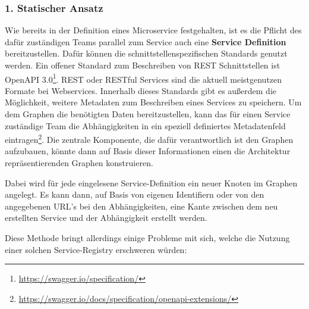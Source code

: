 \subsubsection*{1. Statischer Ansatz}
Wie bereits in der Definition eines Microservice festgehalten, ist es die Pflicht des dafür zuständigen Teams parallel zum Service auch eine \textbf{Service Definition} bereitzustellen. Dafür können die schnittstellenspezifischen Standards genutzt werden. Ein offener Standard zum Beschreiben von REST Schnittstellen ist OpenAPI 3.0\footnote{\url{https://swagger.io/specification/}}. REST oder RESTful Services sind die aktuell meistgenutzen Formate bei Webservices. Innerhalb dieses Standards gibt es außerdem die Möglichkeit, weitere Metadaten zum Beschreiben eines Services zu speichern. Um dem Graphen die benötigten Daten bereitzustellen, kann das für einen Service zuständige Team die Abhängigkeiten in ein speziell definiertes Metadatenfeld eintragen\footnote{\url{https://swagger.io/docs/specification/openapi-extensions/}}. Die zentrale Komponente, die dafür verantwortlich ist den Graphen aufzubauen, könnte dann auf Basis dieser Informationen einen die Architektur repräsentierenden Graphen konstruieren. 

Dabei wird für jede eingelesene Service-Definition ein neuer Knoten im Graphen angelegt. Es kann dann, auf Basis von eigenen Identifiern oder von den angegebenen URL's bei den Abhängigkeiten, eine Kante zwischen dem neu erstellten Service und der Abhängigkeit erstellt werden.


Diese Methode bringt allerdings einige Probleme mit sich, welche die Nutzung einer solchen Service-Registry erschweren würden:

